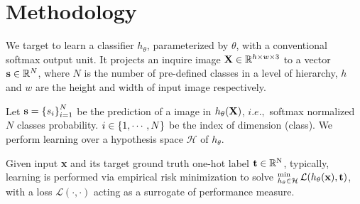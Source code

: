 \documentclass{article}
\theoremstyle{plain}%
\begin{document}








 
\section{Methodology} 



We target to learn a classifier ${h}_\theta$, parameterized by $\theta$, with a conventional softmax output unit. It projects an inquire image ${\rm\textbf{X}}\in\mathbb{R}^{h\times w\times 3}$ to a vector ${\rm\textbf{s}}\in\mathbb{R}^N$, where $N$ is the number of pre-defined classes in a level of hierarchy, $h$ and $w$ are the height and width of input image respectively. 

Let ${\rm\textbf{s}}=\left\{s_i\right\}_{i=1}^{N}$ be the prediction of a image in ${h}_\theta({\rm\textbf{X}})$, $i.e.,$ softmax normalized $N$ classes probability. $i\in\left\{1,\cdots,{\small N}\right\}$ be the index of dimension (class). We perform learning over a hypothesis space $\mathcal{H}$ of ${h}_\theta$. 

Given input {\rm\textbf{x}} and its target ground truth one-hot label ${\rm\textbf{t}\in\mathbb{R}^{N}}$, typically, learning is performed via empirical risk minimization to solve $\mathop{}_{{h}_\theta\in\mathcal{H}}^{\rm min}\mathcal{L}({h}_\theta({\rm\textbf{x}}),{\rm\textbf{t}})$, with a loss $\mathcal{L}(\cdot,\cdot)$ acting as a surrogate of performance measure.
\end{document}
